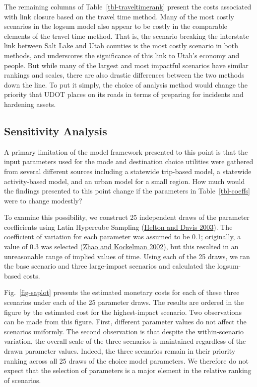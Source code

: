 \documentclass[]{ascelike-new}
\begin{document}
The remaining columns of Table~\ref{tbl-traveltimerank} present the
costs associated with link closure based on the travel time method. Many
of the most costly scenarios in the logsum model also appear to be
costly in the comparable elements of the travel time method. That is,
the scenario breaking the interstate link between Salt Lake and Utah
counties is the most costly scenario in both methods, and underscores
the significance of this link to Utah's economy and people. But while
many of the largest and most impactful scenarios have similar rankings
and scales, there are also drastic differences between the two methods
down the line. To put it simply, the choice of analysis method would
change the priority that UDOT places on its roads in terms of preparing
for incidents and hardening assets.

\hypertarget{sensitivity-analysis}{%
\subsection{Sensitivity Analysis}\label{sensitivity-analysis}}

A primary limitation of the model framework presented to this point is
that the input parameters used for the mode and destination choice
utilities were gathered from several different sources including a
statewide trip-based model, a statewide activity-based model, and an
urban model for a small region. How much would the findings presented to
this point change if the parameters in Table~\ref{tbl-coeffs} were to
change modestly?

To examine this possibility, we construct 25 independent draws of the
parameter coefficients using Latin Hypercube Sampling
(\protect\hyperlink{ref-helton2003}{Helton and Davis 2003}). The
coefficient of variation for each parameter was assumed to be 0.1;
originally, a value of 0.3 was selected
(\protect\hyperlink{ref-zhao2002}{Zhao and Kockelman 2002}), but this
resulted in an unreasonable range of implied values of time. Using each
of the 25 draws, we ran the base scenario and three large-impact
scenarios and calculated the logsum-based costs.

Fig.~\ref{fig-saplot} presents the estimated monetary costs for each of
these three scenarios under each of the 25 parameter draws. The results
are ordered in the figure by the estimated cost for the highest-impact
scenario. Two observations can be made from this figure. First,
different parameter values do not affect the scenarios uniformly. The
second observation is that despite the within-scenario variation, the
overall scale of the three scenarios is maintained regardless of the
drawn parameter values. Indeed, the three scenarios remain in their
priority ranking across all 25 draws of the choice model parameters. We
therefore do not expect that the selection of parameters is a major
element in the relative ranking of scenarios.
\end{document}
